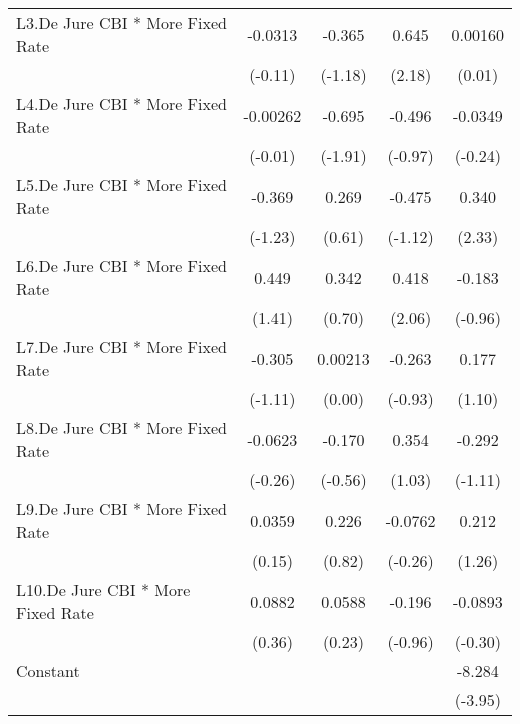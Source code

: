 {\begin{longtable}{l*{4}{c}}
\addlinespace
L3.De Jure CBI * More Fixed Rate&  -0.0313         &   -0.365         &    0.645\sym{*}  &  0.00160         \\
                &  (-0.11)         &  (-1.18)         &   (2.18)         &   (0.01)         \\
\addlinespace
L4.De Jure CBI * More Fixed Rate& -0.00262         &   -0.695         &   -0.496         &  -0.0349         \\
                &  (-0.01)         &  (-1.91)         &  (-0.97)         &  (-0.24)         \\
\addlinespace
L5.De Jure CBI * More Fixed Rate&   -0.369         &    0.269         &   -0.475         &    0.340\sym{*}  \\
                &  (-1.23)         &   (0.61)         &  (-1.12)         &   (2.33)         \\
\addlinespace
L6.De Jure CBI * More Fixed Rate&    0.449         &    0.342         &    0.418\sym{*}  &   -0.183         \\
                &   (1.41)         &   (0.70)         &   (2.06)         &  (-0.96)         \\
\addlinespace
L7.De Jure CBI * More Fixed Rate&   -0.305         &  0.00213         &   -0.263         &    0.177         \\
                &  (-1.11)         &   (0.00)         &  (-0.93)         &   (1.10)         \\
\addlinespace
L8.De Jure CBI * More Fixed Rate&  -0.0623         &   -0.170         &    0.354         &   -0.292         \\
                &  (-0.26)         &  (-0.56)         &   (1.03)         &  (-1.11)         \\
\addlinespace
L9.De Jure CBI * More Fixed Rate&   0.0359         &    0.226         &  -0.0762         &    0.212         \\
                &   (0.15)         &   (0.82)         &  (-0.26)         &   (1.26)         \\
\addlinespace
L10.De Jure CBI * More Fixed Rate&   0.0882         &   0.0588         &   -0.196         &  -0.0893         \\
                &   (0.36)         &   (0.23)         &  (-0.96)         &  (-0.30)         \\
\addlinespace
Constant        &                  &                  &                  &   -8.284\sym{***}\\
                &                  &                  &                  &  (-3.95)         \\

\end{longtable}}
